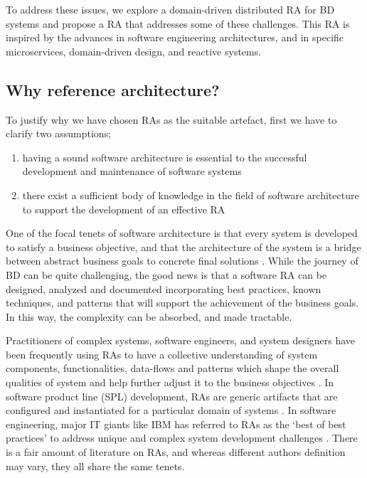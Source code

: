\documentclass{bmcart}
\begin{document}
To address these issues, we explore a domain-driven distributed RA for BD systems and propose a RA that addresses some of these challenges. This RA is inspired by the advances in software engineering architectures, and in specific microservices, domain-driven design, and reactive systems. 

\subsection{Why reference architecture?}

To justify why we have chosen RAs as the suitable artefact, first we have to clarify two assumptions;

\begin{enumerate}
    \item having a sound software architecture is essential to the successful development and maintenance of software systems \cite{SoftwareArchitectureKazman}
    \item there exist a sufficient body of knowledge in the field of software architecture to support the development of an effective RA \cite{AtaeiACIS}
\end{enumerate}

One of the focal tenets of software architecture is that every system is developed to satisfy a business objective, and that the architecture of the system is a bridge between abstract business goals to concrete final solutions \cite{SoftwareArchitectureKazman}. While the journey of BD can be quite challenging, the good news is that a software RA can be designed, analyzed and documented incorporating best practices, known techniques, and patterns that will support the achievement of the business goals. In this way, the complexity can be absorbed, and made tractable.

Practitioners of complex systems, software engineers, and system designers have been frequently using RAs to have a collective understanding of system components, functionalities, data-flows and patterns which shape the overall qualities of system and help further adjust it to the business objectives \cite{Cloutier,kohler2019towards}. In software product line (SPL) development, RAs are generic artifacts that are configured and instantiated for a particular domain of systems \cite{Derras}. In software engineering, major IT giants like IBM has referred to RAs as the `best of best practices' to address unique and complex system development challenges \cite{Cloutier}. There is a fair amount of literature on RAs, and whereas different authors definition may vary, they all share the same tenets.
\end{document}
